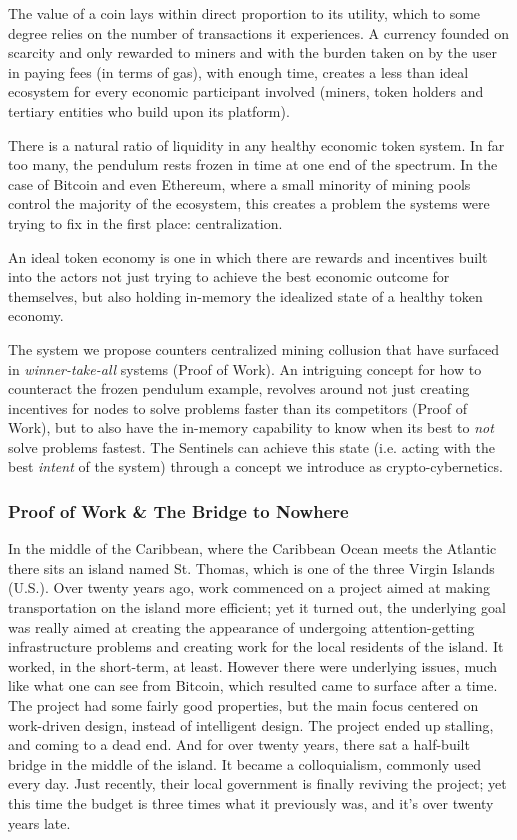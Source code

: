 \documentclass{article}
\begin{document}
The value of a coin lays within direct proportion to its utility, which to some degree relies on the number of transactions it experiences. A currency founded on scarcity and only rewarded to miners and with the burden taken on by the user in paying fees (in terms of gas), with enough time, creates a less than ideal ecosystem for every economic participant involved (miners, token holders and tertiary entities who build upon its platform).

There is a natural ratio of liquidity in any healthy economic token system. In far too many, the pendulum rests frozen in time at one end of the spectrum. In the case of Bitcoin and even Ethereum, where a small minority of mining pools control the majority of the ecosystem, this creates a problem the systems were trying to fix in the first place: centralization.

An ideal token economy is one in which there are rewards and incentives built into the actors not just trying to achieve the best economic outcome for themselves, but also holding in-memory the idealized state of a healthy token economy.

The system we propose counters centralized mining collusion that have surfaced in \textit{winner-take-all} systems (Proof of Work). An intriguing concept for how to counteract the frozen pendulum example, revolves around not just creating incentives for nodes to solve problems faster than its competitors (Proof of Work), but to also have the in-memory capability to know when its best to \textit{not} solve problems fastest. The Sentinels can achieve this state (i.e. acting with the best \textit{intent} of the system) through a concept we introduce as crypto-cybernetics. 

\subsubsection{Proof of Work \& The Bridge to Nowhere}

In the middle of the Caribbean, where the Caribbean Ocean meets the Atlantic there sits an island named St. Thomas, which is one of the three Virgin Islands (U.S.). Over twenty years ago, work commenced on a project aimed at making transportation on the island more efficient; yet it turned out, the underlying goal was really aimed at creating the appearance of undergoing attention-getting infrastructure problems and creating work for the local residents of the island. It worked, in the short-term, at least. However there were underlying issues, much like what one can see from Bitcoin, which resulted came to surface after a time. The project had some fairly good properties, but the main focus centered on work-driven design, instead of intelligent design. The project ended up stalling, and coming to a dead end. And for over twenty years, there sat a half-built bridge in the middle of the island. It became a colloquialism, commonly used every day. Just recently, their local government is finally reviving the project; yet this time the budget is three times what it previously was, and it's over twenty years late. 
\end{document}
